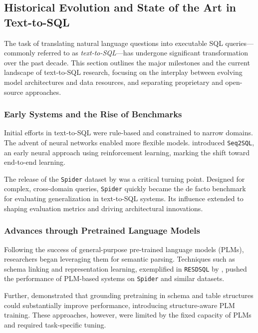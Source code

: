 \subsection{Historical Evolution and State of the Art in Text-to-SQL}

The task of translating natural language questions into executable SQL queries---commonly referred to as \emph{text-to-SQL}---has undergone significant transformation over the past decade. This section outlines the major milestones and the current landscape of text-to-SQL research, focusing on the interplay between evolving model architectures and data resources, and separating proprietary and open-source approaches.

\subsubsection{Early Systems and the Rise of Benchmarks}

Initial efforts in text-to-SQL were rule-based and constrained to narrow domains. The advent of neural networks enabled more flexible models. \citet{zhong2017seq2sql} introduced \texttt{Seq2SQL}, an early neural approach using reinforcement learning, marking the shift toward end-to-end learning.

The release of the \texttt{Spider} dataset by \citet{yu2018spider} was a critical turning point. Designed for complex, cross-domain queries, \texttt{Spider} quickly became the de facto benchmark for evaluating generalization in text-to-SQL systems. Its influence extended to shaping evaluation metrics and driving architectural innovations.

\subsubsection{Advances through Pretrained Language Models}

Following the success of general-purpose pre-trained language models (PLMs), researchers began leveraging them for semantic parsing. Techniques such as schema linking and representation learning, exemplified in \texttt{RESDSQL} by \citet{li2023resdsql}, pushed the performance of PLM-based systems on \texttt{Spider} and similar datasets.

Further, \citet{deng2021structure} demonstrated that grounding pretraining in schema and table structures could substantially improve performance, introducing structure-aware PLM training. These approaches, however, were limited by the fixed capacity of PLMs and required task-specific tuning.

